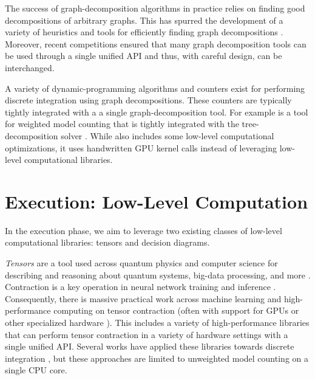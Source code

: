 The success of graph-decomposition algorithms in practice relies on finding good decompositions of arbitrary graphs.
This has spurred the development of a variety of heuristics and tools for efficiently finding graph decompositions \cite{AMW17,HS18,Tamaki17,hicks02}. 
Moreover, recent competitions \cite{DKTW18} ensured that many graph decomposition tools can be used through a single unified API and thus, with careful design, can be interchanged.

A variety of dynamic-programming algorithms \cite{FMR08,SS10} and counters \cite{CW16,FHMW17,FHWZ18,FHZ19} exist for performing discrete integration using graph decompositions.
These counters are typically tightly integrated with a a single graph-decomposition tool.
For example  \cite{FHWZ18,FHZ19} is a tool for weighted model counting that is tightly integrated with the tree-decomposition solver  \cite{AMW17}. While  also includes some low-level computational optimizations, it uses handwritten GPU kernel calls instead of leveraging low-level computational libraries.


\section{Execution: Low-Level Computation}
\label{sec:intro:execution}
In the execution phase, we aim to leverage two existing classes of low-level computational libraries: tensors and decision diagrams. 

\emph{Tensors} are a tool used across quantum physics and computer science for describing and reasoning about quantum systems, big-data processing, and more \cite{BB17,Cichocki14,Orus19}.
Contraction is a key operation in neural network training and inference \cite{BK07,Hirata03,KKCLA17,VZTGDMVAC18}.
Consequently, there is massive practical work across machine learning and high-performance computing on tensor contraction \cite{BK07,Hirata03,KKCLA17,VZTGDMVAC18} (often with support for GPUs \cite{KSTKPPRS19,NRBHHJN15} or other specialized hardware \cite{JYPPABBBBB17}).
This includes a variety of high-performance libraries that can perform tensor contraction \cite{numpy,ABCCDDDGII16,PGMLJGKLGA19} in a variety of hardware settings with a single unified API.
Several works have applied these libraries towards discrete integration \cite{BMT15,KCMR18}, but these approaches are limited to unweighted model counting on a single CPU core.


